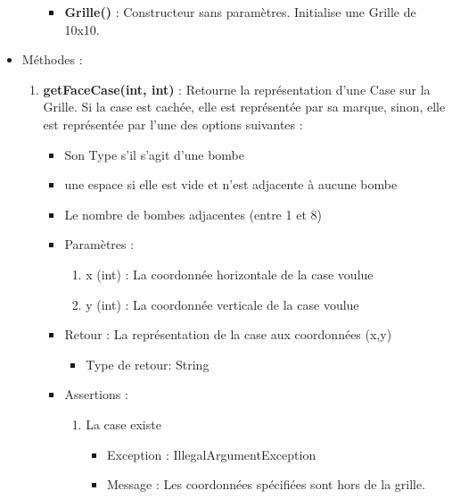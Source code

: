\begin{itemize}
\begin{enumerate}
\begin{itemize}
    \item {\bf Grille() }: Constructeur sans paramètres. Initialise une Grille de 10x10.
    \end{itemize}
    
  \end{enumerate}

  \item Méthodes : 

    \begin{enumerate}
      
    \item {\bf getFaceCase(int, int) }: Retourne la représentation d'une Case sur la Grille.
      Si la case est cachée, elle est représentée par sa marque, sinon, elle est représentée par l'une des options suivantes :
      \begin{itemize}
      \item Son Type s'il s'agit d'une bombe
      \item une espace si elle est vide et n'est adjacente à aucune bombe
      \item Le nombre de bombes adjacentes (entre 1 et 8)
      \end{itemize}
      \begin{itemize}
      \item Paramètres : 
        \begin{enumerate}
        \item x (int) : La coordonnée horizontale de la case voulue
        \item y (int) : La coordonnée verticale de la case voulue          
        \end{enumerate}
      \item Retour : La représentation de la case aux coordonnées (x,y)
          \begin{itemize}
          \item Type de retour: String
          \end{itemize}
      \item Assertions : 
        \begin{enumerate}
        \item La case existe
          \begin{itemize}
            \item Exception : IllegalArgumentException
          \item Message : Les coordonnées spécifiées sont hors de la grille.
          \end{itemize}
        \end{enumerate}
      \end{itemize}
      

\end{enumerate}
\end{itemize}

